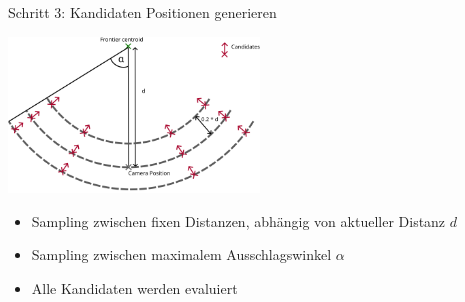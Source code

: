 \documentclass[aspectratio=169]{beamer}
\begin{document}
\begin{frame}{Schritt 3: Kandidaten Positionen generieren}
	\begin{block}{}
		\begin{center}
			\includegraphics[width=0.5\textwidth]{Graphics/view_point_gen_v2.png}
		\end{center}
		\begin{itemize}
			\item Sampling zwischen fixen Distanzen, abhängig von aktueller Distanz $d$
			\item Sampling zwischen maximalem Ausschlagswinkel $\alpha$
			\item Alle Kandidaten werden evaluiert
		\end{itemize}
	\end{block}

\end{frame}
\end{document}
